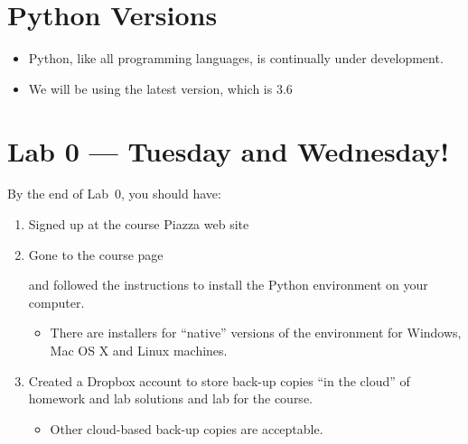 \documentclass[letterpaper,10pt,english]{sphinxmanual}
\begin{document}
\section{Python Versions}
\label{\detokenize{lecture_notes/lec01_intro:python-versions}}\begin{itemize}
\item {} 
Python, like all programming languages, is continually under
development.

\item {} 
We will be using the latest version, which is 3.6

\end{itemize}


\section{Lab 0 — Tuesday and Wednesday!}
\label{\detokenize{lecture_notes/lec01_intro:lab-0-tuesday-and-wednesday}}
By the end of Lab 0, you should have:
\begin{enumerate}
\item {} 
Signed up at the course Piazza web site
\begin{quote}

\end{quote}

\item {} 
Gone to the course page
\begin{quote}

\end{quote}

and followed the instructions to install the Python environment on
your computer.
\begin{itemize}
\item {} 
There are installers for “native” versions of the environment for
Windows, Mac OS X and Linux machines.

\end{itemize}

\item {} 
Created a Dropbox account to store back-up copies “in the cloud” of
homework and lab solutions and lab for the course.
\begin{itemize}
\item {} 
Other cloud-based back-up copies are acceptable.

\end{itemize}

\end{enumerate}
\end{document}
